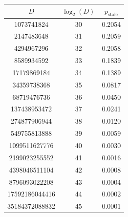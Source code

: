 \begin{tabular}{|c|c|c|}
\hline
$D$ & $\log_2(D)$ & $p_{\text{stale}}$ \\
\hline
1073741824 & 30 & 0.2054 \\ 
2147483648 & 31 & 0.2059 \\ 
4294967296 & 32 & 0.2058 \\ 
8589934592 & 33 & 0.1839 \\ 
17179869184 & 34 & 0.1389 \\ 
34359738368 & 35 & 0.0817 \\ 
68719476736 & 36 & 0.0450 \\ 
137438953472 & 37 & 0.0241 \\ 
274877906944 & 38 & 0.0120 \\ 
549755813888 & 39 & 0.0059 \\ 
1099511627776 & 40 & 0.0030 \\ 
2199023255552 & 41 & 0.0016 \\ 
4398046511104 & 42 & 0.0008 \\ 
8796093022208 & 43 & 0.0004 \\ 
17592186044416 & 44 & 0.0002 \\ 
35184372088832 & 45 & 0.0001 \\ 
\hline
\end{tabular}
